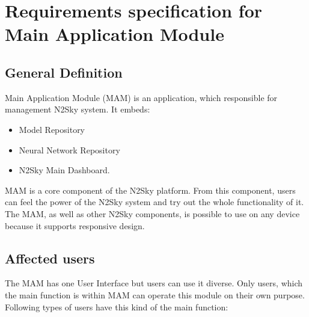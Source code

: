 
\section{Requirements specification for Main Application Module}\label{Requirements specifications for Main Application Module}
\subsection{General Definition}\label{GeneralDefinition main}
Main Application Module (MAM) is an application, which responsible for management N2Sky system. It embeds:
\begin{itemize}
\item Model Repository 
\item Neural Network Repository 
\item N2Sky Main Dashboard.
\end{itemize}

MAM is a core component of the N2Sky platform. From this component, users can feel the power of the N2Sky system and try out the whole functionality of it. The MAM, as well as other N2Sky components, is possible to use on any device because it supports responsive design. 

\subsection{Affected users}\label{Affected users MAM}
The MAM has one User Interface but users can use it diverse. Only users, which the main function is within MAM can operate this module on their own purpose. Following types of users have this kind of the main function:


